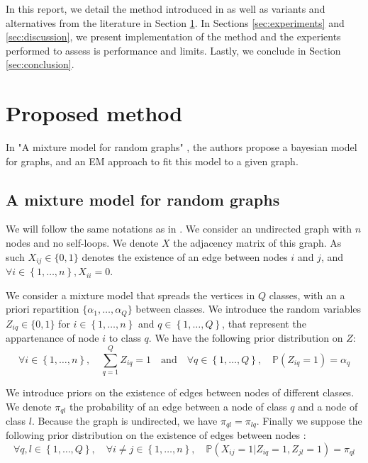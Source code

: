 \documentclass[10pt]{article}
\begin{document}
In this report, we detail the method introduced in \cite{main_article} as well as variants and alternatives from the literature in Section \ref{sec:method}. In Sections \ref{sec:experiments} and \ref{sec:discussion}, we present implementation of the method and the experients performed to assess is performance and limits. Lastly, we conclude in Section \ref{sec:conclusion}.


\section{Proposed method}
    \label{sec:method}

In "A mixture model for random graphs" \cite{main_article}, the authors propose a bayesian model for graphs, and an EM approach to fit this model to a given graph.

\subsection{A mixture model for random graphs}

We will follow the same notations as in \cite{main_article}. We consider an undirected graph with $n$ nodes and no self-loops. We denote $X$ the adjacency matrix of this graph. As such $X_{ij}\in \{0,1\}$ denotes the existence of an edge between nodes $i$ and $j$, and $\forall i\in \left\{1,\dots,n\right\}, X_{ii}=0$.

We consider a mixture model that spreads the vertices in $Q$ classes, with an a priori repartition $\{\alpha_1, \dots, \alpha_Q\}$ between classes. We introduce the random variables $Z_{iq} \in \{0,1\}$ for $i\in \left\{1,\dots,n\right\}$ and $q\in \left\{1,\dots,Q\right\}$, that represent the appartenance of node $i$ to class $q$. We have the following prior distribution on $Z$:
\begin{equation}
    \forall i\in \left\{1,\dots,n\right\}, \quad \sum_{q=1}^Q Z_{iq} = 1 \quad \text{and} \quad \forall q\in \left\{1,\dots,Q\right\},\quad \mathbb{P}(Z_{iq}=1)=\alpha_q
\end{equation}

We introduce priors on the existence of edges between nodes of different classes. We denote $\pi_{ql}$ the probability of an edge between a node of class $q$ and a node of class $l$. Because the graph is undirected, we have $\pi_{ql}=\pi_{lq}$. Finally we suppose the following prior distribution on the existence of edges between nodes :
\begin{equation}
    \forall q,l\in \left\{1,\dots,Q\right\}, \quad \forall i\neq j\in \left\{1,\dots,n\right\}, \quad \mathbb{P}(X_{ij}=1|Z_{iq}=1,Z_{jl}=1)=\pi_{ql}
\end{equation}
\end{document}
